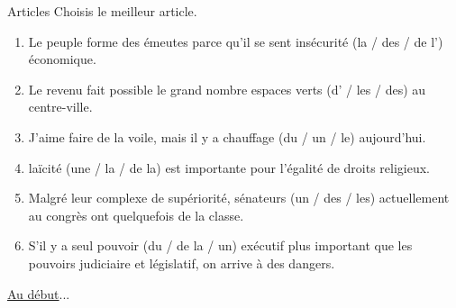 \begin{frame}{Articles}
  \small
  Choisis le meilleur article.
  \begin{enumerate}
    \item Le peuple forme des émeutes parce qu'il se sent \underline{} insécurité (la / des / de l') économique.
    \item Le revenu fait possible le grand nombre \underline{} espaces verts (d' / les / des) au centre-ville.
    \item J'aime faire de la voile, mais il y a \underline{} chauffage (du / un / le) aujourd'hui.
    \item \underline{} laïcité (une / la / de la) est importante pour l'égalité de droits religieux.
    \item Malgré leur complexe de supériorité, \underline{} sénateurs (un / des / les) actuellement au congrès ont quelquefois de la classe.
    \item S'il y a \underline{} seul pouvoir (du / de la / un) exécutif plus important que les pouvoirs judiciaire et législatif, on arrive à des dangers.
  \end{enumerate}
  \raggedleft\raggedleft\hyperlink{début}{Au début}...
\end{frame}
